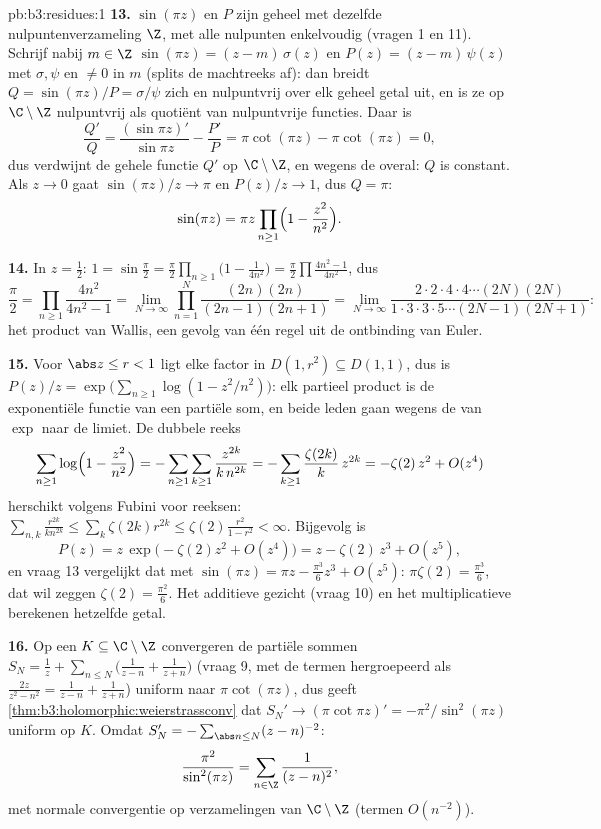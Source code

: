 \begin{solution}{pb:b3:residues:1}
\textbf{13.} $\sin(\pi z)$ en $P$ zijn geheel met dezelfde
nulpuntenverzameling $\Z$, met alle nulpunten enkelvoudig (vragen
1 en 11). Schrijf nabij $m \in \Z$ $\sin(\pi z) = (z -
m)\,\sigma(z)$ en $P(z) = (z - m)\,\psi(z)$ met $\sigma, \psi$
 en $\neq 0$ in $m$ (splits de machtreeks af): dan breidt
$Q = \sin(\pi z)/P = \sigma/\psi$ zich  en nulpuntvrij
over elk geheel getal uit, en is ze op $\C\setminus\Z$
nulpuntvrij als quotiënt van nulpuntvrije functies. Daar is
\[
\frac{Q'}{Q} = \frac{(\sin\pi z)'}{\sin\pi z} -
\frac{P'}{P} = \pi\cot(\pi z) - \pi\cot(\pi z) = 0 ,
\]
dus verdwijnt de gehele functie $Q'$ op $\C\setminus\Z$, en
wegens de  overal: $Q$ is constant. Als $z \to 0$
gaat $\sin(\pi z)/z \to \pi$ en $P(z)/z \to 1$, dus $Q = \pi$:
\[
\sin(\pi z) = \pi z\prod_{n\geq1}
\Bigl(1 - \frac{z^2}{n^2}\Bigr) .
\]

\textbf{14.} In $z = \frac12$: $1 = \sin\frac\pi2 =
\frac\pi2\prod_{n\geq1}\bigl(1 - \frac1{4n^2}\bigr) =
\frac\pi2\prod\frac{4n^2-1}{4n^2}$, dus
\[
\frac\pi2 = \prod_{n\geq1}\frac{4n^2}{4n^2 - 1}
= \lim_{N\to\infty}\prod_{n=1}^N
\frac{(2n)(2n)}{(2n-1)(2n+1)}
= \lim_{N\to\infty}
\frac{2\cdot2\cdot4\cdot4\cdots(2N)(2N)}
{1\cdot3\cdot3\cdot5\cdots(2N-1)(2N+1)} :
\]
het product van Wallis, een gevolg van één regel uit de
ontbinding van Euler.

\textbf{15.} Voor $\abs z \leq r < 1$ ligt elke factor in $D(1,
r^2) \subseteq D(1, 1)$, dus is $P(z)/z = \exp\bigl(
\sum_{n\geq1}\log(1 - z^2/n^2)\bigr)$: elk partieel product is de
exponentiële functie van een partiële som, en beide leden gaan
wegens de  van $\exp$ naar de limiet. De dubbele
reeks
\[
\sum_{n\geq1}\log\Bigl(1 - \frac{z^2}{n^2}\Bigr)
= -\sum_{n\geq1}\sum_{k\geq1}\frac{z^{2k}}{k\,n^{2k}}
= -\sum_{k\geq1}\frac{\zeta(2k)}k\,z^{2k}
= -\zeta(2)\,z^2 + O(z^4)
\]
herschikt volgens Fubini voor reeksen: $\sum_{n,k}
\frac{r^{2k}}{kn^{2k}} \leq \sum_k\zeta(2k)r^{2k} \leq
\zeta(2)\frac{r^2}{1-r^2} < \infty$. Bijgevolg is
\[
P(z) = z\,\exp\bigl(-\zeta(2)z^2 + O(z^4)\bigr)
= z - \zeta(2)\,z^3 + O(z^5) ,
\]
en vraag 13 vergelijkt dat met $\sin(\pi z) = \pi z -
\frac{\pi^3}6z^3 + O(z^5)$: $\pi\zeta(2) = \frac{\pi^3}6$, dat
wil zeggen $\zeta(2) = \frac{\pi^2}6$. Het additieve gezicht
(vraag 10) en het multiplicatieve berekenen hetzelfde getal.

\textbf{16.} Op een  $K \subseteq \C\setminus\Z$
convergeren de partiële sommen $S_N = \frac1z + \sum_{n\leq
N}\bigl(\frac1{z-n} + \frac1{z+n}\bigr)$ (vraag 9, met de termen
hergroepeerd als $\frac{2z}{z^2-n^2} = \frac1{z-n} +
\frac1{z+n}$) uniform naar $\pi\cot(\pi z)$, dus geeft
\cref{thm:b3:holomorphic:weierstrassconv} dat $S_N' \to
(\pi\cot\pi z)' = -\pi^2/\sin^2(\pi z)$ uniform op $K$. Omdat
$S_N' = -\sum_{\abs n\leq N}(z - n)^{-2}$:
\[
\frac{\pi^2}{\sin^2(\pi z)} =
\sum_{n\in\Z}\frac1{(z - n)^2} ,
\]
met normale convergentie op  verzamelingen van
$\C\setminus\Z$ (termen $O(n^{-2})$).


\end{solution}
